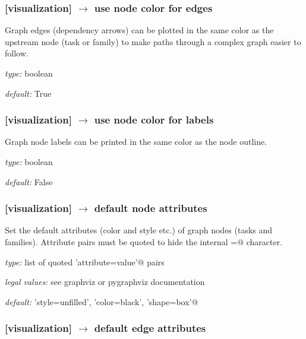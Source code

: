 \subsubsection[use node color for edges]{[visualization] $\rightarrow$ use node color for edges}

Graph edges (dependency arrows) can be plotted in the same color
as the upstream node (task or family) to make paths through a complex
graph easier to follow.

\begin{myitemize}
    \item {\em type:} boolean
    \item {\em default:} True
\end{myitemize}

\subsubsection[use node color for labels]{[visualization] $\rightarrow$ use node color for labels}

Graph node labels can be printed in the same color as the node outline.

\begin{myitemize}
    \item {\em type:} boolean
    \item {\em default:} False
\end{myitemize}


\subsubsection[default node attributes]{[visualization] $\rightarrow$ default node attributes}

Set the default attributes (color and style etc.) of graph nodes (tasks and families).
Attribute pairs must be quoted to hide the internal \lstinline@=@ character.

\begin{myitemize}
    \item {\em type:} list of quoted \lstinline@'attribute=value'@ pairs
    \item {\em legal values:} see graphviz or pygraphviz documentation
    \item {\em default:} \lstinline@'style=unfilled', 'color=black', 'shape=box'@
\end{myitemize}

\subsubsection[default edge attributes]{[visualization] $\rightarrow$ default edge attributes}

